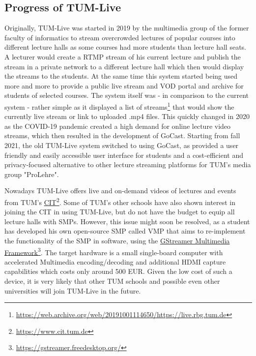 \subsection{Progress of TUM-Live}

Originally, TUM-Live was started in 2019 by the multimedia group of the former faculty of informatics to stream overcrowded lectures of popular courses into different lecture halls as some courses had more students than lecture hall seats. A lecturer would create a RTMP stream of his current lecture and publish the stream in a private network to a different lecture hall which then would display the streams to the students. At the same time this system started being used more and more to provide a public live stream and \ac{VOD} portal and archive for students of selected courses. The system itself was - in comparison to the current system - rather simple as it displayed a list of streams\footnote{\url{https://web.archive.org/web/20191001114650/https://live.rbg.tum.de}} that would show the currently live stream or link to uploaded .mp4 files.
This quickly changed in 2020 as the COVID-19 pandemic created a high demand for online lecture video streams, which then resulted in the development of GoCast. Starting from fall 2021, the old TUM-Live system switched to using GoCast, as provided a user friendly and easily accessible user interface for students and a cost-efficient and privacy-focused alternative to other lecture streaming platforms for \ac{TUM}'s media group "ProLehre". 

Nowadays TUM-Live offers live and on-demand videos of lectures and events from \ac{TUM}'s \href{https://www.cit.tum.de}{\ac{CIT}}\footnote{\url{https://www.cit.tum.de}}. Some of \ac{TUM}'s other schools have also shown interest in joining the \ac{CIT} in using TUM-Live, but do not have the budget to equip all lecture halls with \ac{SMP}s. However, this issue might soon be resolved, as a student has developed his own open-source \ac{SMP} called \ac{VMP} that aims to re-implement the functionality of the \ac{SMP} in software, using the \href{https://gstreamer.freedesktop.org/}{GStreamer Multimedia Framework}\footnote{\url{https://gstreamer.freedesktop.org/}}. The target hardware is a small single-board computer with accelerated Multimedia encoding/decoding and additional HDMI capture capabilities which costs only around 500 EUR. Given the low cost of such a device, it is very likely that other \ac{TUM} schools and possible even other universities will join TUM-Live in the future.

